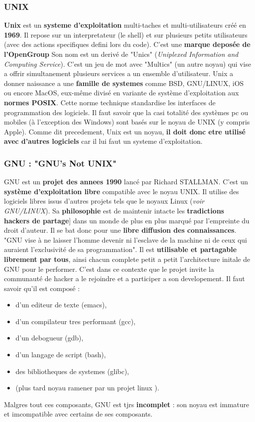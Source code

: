 \subsubsection{UNIX}

\textbf{Unix} est un \textbf{systeme d'exploitation} multi-taches et multi-utilisateurs créé en \textbf{1969}. Il repose sur un interpretateur (le shell) et sur plusieurs petits utilisateurs (avec des actions specifiques defini lors du code). C'est une \textbf{marque deposée de l'OpenGroup}
Son nom est un derivé de "Unics" (\textit{Uniplexed Information and Computing Service}). C'est un jeu de mot avec "Multics" (un autre noyau) qui vise a offrir simultanement plusieurs services a un ensemble d'utilisateur.
Unix a donner naissance a une \textbf{famille de systemes} comme BSD, GNU/LINUX, iOS ou encore MacOS, eux-même divisé en variante de système d'exploitation aux \textbf{normes POSIX}. Cette norme technique standardise les interfaces de programmation des logiciels. 
Il faut savoir que la casi totalité des systèmes pc ou mobiles (à l'exception des Windows) sont basés sur le noyau de UNIX (y compris Apple). 
Comme dit precedement, Unix est un noyau, \textbf{il doit donc etre utilisé avec d'autres logiciels} car il lui faut un systeme d'exploitation. \newline


\subsubsection{GNU : "GNU's Not UNIX"}

GNU est un \textbf{projet des annees 1990} lancé par Richard STALLMAN. C'est un \textbf{système d'exploitation libre} compatible avec le noyau UNIX. Il utilise des logiciels libres issus d'autres projets tels que le noyaux Linux (\textit{voir GNU/LINUX}). 
Sa \textbf{philosophie} est de maintenir intacte les \textbf{tradictions hackers de partage}] dans un monde de plus en plus marqué par l'empreinte du droit d'auteur. Il se bat donc pour une \textbf{libre diffusion des connaissances}. "GNU vise à ne laisser l'homme devenir ni l'esclave de la machine ni de ceux qui auraient l'exclusivité de sa programmation". 
Il est \textbf{utilisable et partagable librement par tous}, ainsi chacun complete petit a petit l'architecture initale de GNU pour le performer. C'est dans ce contexte que le projet invite la communauté de hacker a le rejoindre et a participer a son developement. 
Il faut savoir qu'il est composé : 
\begin{itemize}
	\item d'un editeur de texte (emacs),
	\item d'un compilateur tres performant (gcc),
	\item d'un debogueur (gdb), 
	\item d'un langage de script (bash),
	\item des bibliotheques de systemes (glibc),  
	\item (plus tard noyau ramener par un projet linux ). 
\end{itemize}
Malgres tout ces composants, GNU est tjrs \textbf{incomplet} : son noyau est immature et imcompatible avec certains de ses composants. \newline


